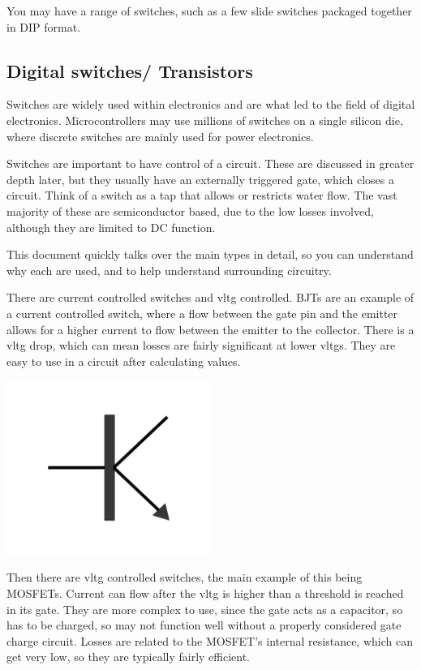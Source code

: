 \documentclass[a4paper,11pt]{report}
\begin{document}
You may have a range of switches, such as a few slide switches packaged together in DIP format.

\subsection{Digital switches/ Transistors}

Switches are widely used within electronics and are what led to the field of digital electronics. Microcontrollers may use millions of switches on a single silicon die, where discrete switches are mainly used for power electronics.

Switches are important to have control of a circuit. These are discussed in greater depth later, but they usually have an externally triggered gate, which closes a circuit. Think of a switch as a tap that allows or restricts water flow. The vast majority of these are semiconductor based, due to the low losses involved, although they are limited to DC function.

This document quickly talks over the main types in detail, so you can understand why each are used, and to help understand surrounding circuitry.

There are current controlled switches and \gls{vltg} controlled. BJTs are an example of a current controlled switch, where a flow between the gate pin and the emitter allows for a higher current to flow between the emitter to the collector. There is a \gls{vltg} drop, which can mean losses are fairly significant at lower \gls{vltg}s. They are easy to use in a circuit after calculating values.

\includegraphics[width=0.5\textwidth]{bjt}

Then there are \gls{vltg} controlled switches, the main example of this being MOSFETs. Current can flow after the \gls{vltg} is higher than a threshold is reached in its gate. They are more complex to use, since the gate acts as a capacitor, so has to be charged, so may not function well without a properly considered gate charge circuit. Losses are related to the MOSFET's internal resistance, which can get very low, so they are typically fairly efficient.
\end{document}
